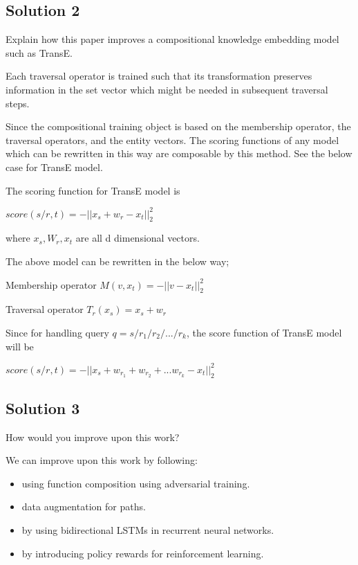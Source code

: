 \documentclass[12pt,leqno,a4paper]{article}
\begin{document}
\subsection{Solution 2}
Explain how this paper improves a compositional knowledge embedding
model such as TransE.
\newline

Each traversal operator is trained such that its transformation preserves information in the set vector which might be needed in subsequent
traversal steps.

Since the compositional training object is based on  the membership operator, the traversal operators, and the entity vectors. The scoring functions of any model which can be rewritten in this way are composable by this method. See the below case for TransE model.

\vspace{5pt}


The scoring function for TransE model is 

$score(s/r,t) = -||x_{s}+w_{r}-x_t||_{2}^{2} $ 

where $x_{s},W_{r},x_t$ are all d dimensional vectors. 

The above model can be rewritten in the below way;

Membership operator $M(v,x_t) = -||v -x_t||_{2}^{2}$ 

Traversal operator $T_{r}(x_s)= x_s+w_r$ 

Since for handling query $q=s/r_1/r_2/.../r_k$, the score function of TransE model will be 

$score(s/r,t) = -||x_{s}+w_{r_1}+w_{r_2}+...w_{r_k}-x_t||_{2}^{2} $ 

\subsection{Solution 3}
How would you improve upon this work?
\newline

We can improve upon this work by following:
\begin{itemize}
    \item using function composition using adversarial training.
    \item data augmentation for paths.
    \item by using bidirectional LSTMs in recurrent neural networks.
    \item by introducing policy rewards for reinforcement learning.
    
\end{itemize}
\end{document}
